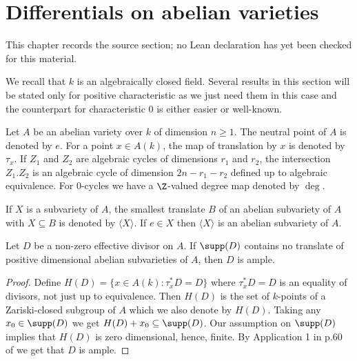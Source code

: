 \chapter{Differentials on abelian varieties}
\label{chabauty-coleman-bound-surfaces-chapter-05}

\begin{remark}
\label{chabauty-coleman-bound-surfaces-chapter-05-source}
This chapter records the source section; no Lean declaration has yet been checked for this material.
\notready
\end{remark}

\label{SecRestrictions}

We recall that $k$ is an algebraically closed field. Several results in this section will be stated only for positive characteristic as we just need them in this case and the counterpart for characteristic $0$ is either easier or well-known.

Let $A$ be an abelian variety over $k$ of dimension $n\ge 1$. The neutral point of $A$ is denoted by $e$. For a point $x\in A(k)$, the map of translation by $x$ is denoted by $\tau_x$. If $Z_1$ and $Z_2$ are algebraic cycles of dimensions $r_1$ and $r_2$, the intersection $Z_1.Z_2$ is an algebraic cycle of dimension $2n-r_1-r_2$ defined up to algebraic equivalence. For $0$-cycles we have a $\Z$-valued degree map denoted by $\deg$.

If $X$ is a subvariety of $A$, the smallest translate $B$ of an abelian subvariety of $A$ with $X\subseteq B$ is denoted by $\langle X\rangle$. If $e\in X$ then $\langle X\rangle$ is an abelian subvariety of $A$.

\begin{lemma}
\notready\label{LemmaAmpleAbVar} Let $D$ be a non-zero effective divisor on $A$. If $\supp(D)$ contains no translate of positive dimensional abelian subvarieties of $A$, then $D$ is ample.
\end{lemma}
\begin{proof} Define $H(D)=\{x\in A(k) : \tau_x^*D=D\}$ where $\tau_x^*D=D$ is an equality of divisors, not just up to equivalence. Then $H(D)$ is the set of $k$-points of a Zariski-closed subgroup of $A$ which we also denote by $H(D)$. Taking any $x_0\in \supp(D)$ we get $H(D)+x_0\subseteq \supp(D)$. Our assumption on $\supp(D)$ implies that $H(D)$ is zero dimensional, hence, finite. By Application 1 in p.60 of \cite{Mumford} we get that $D$ is ample.
\end{proof}

